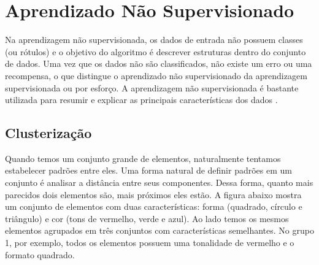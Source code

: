 \clearpage
\section{Aprendizado Não Supervisionado}

Na aprendizagem não supervisionada, os dados de entrada não possuem classes (ou rótulos) e o objetivo do algoritmo é descrever estruturas dentro do conjunto de dados. Uma vez que os dados não são classificados, não existe um erro ou uma recompensa, o que distingue o aprendizado não supervisionado da aprendizagem supervisionada ou por esforço. A aprendizagem não supervisionada é bastante utilizada para resumir e explicar as principais características dos dados \cite{jordan2004}.


\subsection{Clusterização}
\label{sec:clusterização}

Quando temos um conjunto grande de elementos, naturalmente tentamos estabelecer padrões entre eles. Uma forma natural de definir padrões em um conjunto é analisar a distância entre seus componentes. Dessa forma, quanto mais parecidos dois elementos são, mais próximos eles estão. A figura abaixo mostra um conjunto de elementos com duas características: forma (quadrado, círculo e triângulo) e cor (tons de vermelho, verde e azul). Ao lado temos os mesmos elementos agrupados em três conjuntos com características semelhantes. No grupo 1, por exemplo, todos os elementos possuem uma tonalidade de vermelho e o formato quadrado.

